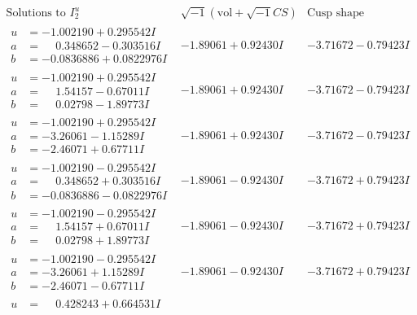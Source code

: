\documentclass[1p]{elsarticle_modified}
\theoremstyle{definition}
\newcommand{\I}{\sqrt{-1}}
\begin{document}
$$\begin{array}{c|c|c}  
\text{Solutions to }I^u_{2}& \I (\text{vol} + \sqrt{-1}CS) & \text{Cusp shape}\\
 \hline 
\begin{aligned}
u &= -1.002190 + 0.295542 I \\
a &= \phantom{-}0.348652 - 0.303516 I \\
b &= -0.0836886 + 0.0822976 I\end{aligned}
 & -1.89061 + 0.92430 I & -3.71672 - 0.79423 I \\ \hline\begin{aligned}
u &= -1.002190 + 0.295542 I \\
a &= \phantom{-}1.54157 - 0.67011 I \\
b &= \phantom{-}0.02798 - 1.89773 I\end{aligned}
 & -1.89061 + 0.92430 I & -3.71672 - 0.79423 I \\ \hline\begin{aligned}
u &= -1.002190 + 0.295542 I \\
a &= -3.26061 - 1.15289 I \\
b &= -2.46071 + 0.67711 I\end{aligned}
 & -1.89061 + 0.92430 I & -3.71672 - 0.79423 I \\ \hline\begin{aligned}
u &= -1.002190 - 0.295542 I \\
a &= \phantom{-}0.348652 + 0.303516 I \\
b &= -0.0836886 - 0.0822976 I\end{aligned}
 & -1.89061 - 0.92430 I & -3.71672 + 0.79423 I \\ \hline\begin{aligned}
u &= -1.002190 - 0.295542 I \\
a &= \phantom{-}1.54157 + 0.67011 I \\
b &= \phantom{-}0.02798 + 1.89773 I\end{aligned}
 & -1.89061 - 0.92430 I & -3.71672 + 0.79423 I \\ \hline\begin{aligned}
u &= -1.002190 - 0.295542 I \\
a &= -3.26061 + 1.15289 I \\
b &= -2.46071 - 0.67711 I\end{aligned}
 & -1.89061 - 0.92430 I & -3.71672 + 0.79423 I \\ \hline\begin{aligned}
u &= \phantom{-}0.428243 + 0.664531 I \\

\end{aligned}
\end{array}$$
\end{document}
